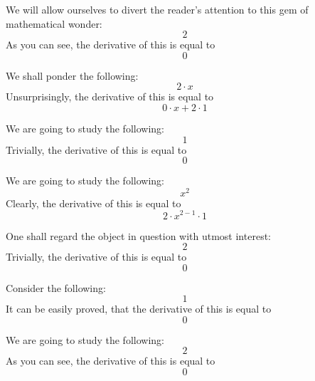 \documentclass{article}
\begin{document}
We will allow ourselves to divert the reader's attention to this gem of mathematical wonder:
\begin{equation}
2 
\end{equation}
As you can see, the derivative of this is equal to
\begin{equation}
0 
\end{equation}

We shall ponder the following:
\begin{equation}
2 \cdot x 
\end{equation}
Unsurprisingly, the derivative of this is equal to
\begin{equation}
0 \cdot x + 2 \cdot 1 
\end{equation}

We are going to study the following:
\begin{equation}
1 
\end{equation}
Trivially, the derivative of this is equal to
\begin{equation}
0 
\end{equation}

We are going to study the following:
\begin{equation}
x ^{2 } 
\end{equation}
Clearly, the derivative of this is equal to
\begin{equation}
2 \cdot x ^{2 - 1 } \cdot 1 
\end{equation}

One shall regard the object in question with utmost interest:
\begin{equation}
2 
\end{equation}
Trivially, the derivative of this is equal to
\begin{equation}
0 
\end{equation}

Consider the following:
\begin{equation}
1 
\end{equation}
It can be easily proved, that the derivative of this is equal to
\begin{equation}
0 
\end{equation}

We are going to study the following:
\begin{equation}
2 
\end{equation}
As you can see, the derivative of this is equal to
\begin{equation}
0 
\end{equation}
\end{document}
